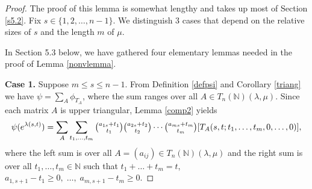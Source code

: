 \documentclass[ALCO,Unicode]{cedram}
\newcommand{\la}{\lambda}
\numberwithin{equation}{section}
\begin{document}
	\begin{proof}The proof of this lemma is somewhat lengthy and takes up most of Section \ref{s5.2}. Fix $s \in \{1, 2, \dots, n-1\}$. We distinguish 3 cases that depend on the relative sizes of $s$ and the length $m$ of $\mu$. 
	
	In Section 5.3 below, we have gathered four elementary lemmas needed in the proof of Lemma \ref{nonvlemma}.
	
	\textbf{Case 1.} Suppose $m \le s \le n-1$. From Definition \ref{defpsi} and Corollary \ref{triang} we have $\psi = \sum_{A} \phi_{T_{A}}$, where the sum ranges over all $A \in T_{n}(\mathbb{N})(\la, \mu)$. Since each matrix $A$ is upper triangular, Lemma \ref{comp2} yields \begin{equation}\label{511}
		\psi(e^{\la(s,t)})=\sum_{A}\sum_{t_1,\dots,t_{m}}\tbinom{a_{1s}+t_1}{t_1}\tbinom{a_{2s}+t_2}{t_2} \cdots \tbinom{a_{ms}+t_m}{t_m}[T_A(s,t;t_1,\dots,t_{m},0,\dots,0)],\end{equation}
where the left sum is over all $A=(a_{ij}) \in T_{n}(\mathbb{N})(\la, \mu)$ and the right sum is over all  $t_1,\dots,t_{m} \in \mathbb{N}$ such that $t_{1}+\dots+t_{m}=t$, \; $a_{1,s+1}-t_1 \ge 0, \; \dots, \; a_{m,s+1}-t_{m} \ge 0$.


\end{proof}
\end{document}
